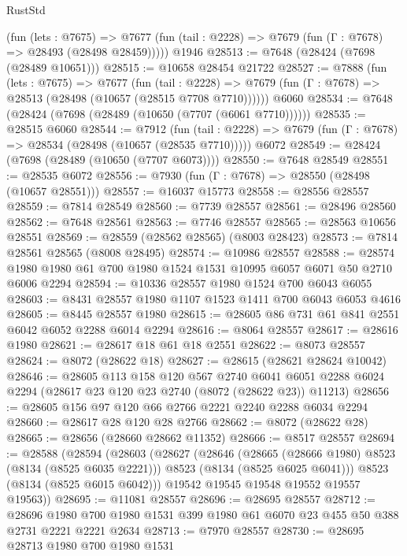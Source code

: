 \begin{lexlean}{RustStd}
\begin{coremodule}
{\begin{coremodule}
{{{{{{{{{{{{{{{{{{{{{{{{{{{{{{{{{{{{{{{{{{{{{{{{{{{{{      (fun (lets : @7675) =>
      @7677 (fun (tail : @2228) => @7679 (fun (Γ : @7678) => @28493 (@28498 @28459)))))
    @1946
@28513 := @7648 (@28424 (@7698 (@28489 @10651)))
@28515 := @10658 @28454 @21722
@28527 := @7888
    (fun (lets : @7675) =>
    @7677
      (fun (tail : @2228) =>
      @7679 (fun (Γ : @7678) => @28513 (@28498 (@10657 (@28515 @7708 @7710))))))
    @6060
@28534 := @7648 (@28424 (@7698 (@28489 (@10650 (@7707 (@6061 @7710))))))
@28535 := @28515 @6060
@28544 := @7912
    (fun (tail : @2228) => @7679 (fun (Γ : @7678) => @28534 (@28498 (@10657 (@28535 @7710)))))
    @6072
@28549 := @28424 (@7698 (@28489 (@10650 (@7707 @6073))))
@28550 := @7648 @28549
@28551 := @28535 @6072
@28556 := @7930 (fun (Γ : @7678) => @28550 (@28498 (@10657 @28551)))
@28557 := @16037 @15773
@28558 := @28556 @28557
@28559 := @7814 @28549
@28560 := @7739 @28557
@28561 := @28496 @28560
@28562 := @7648 @28561
@28563 := @7746 @28557
@28565 := @28563 @10656 @28551
@28569 := @28559 (@28562 @28565) (@8003 @28423)
@28573 := @7814 @28561 @28565 (@8008 @28495)
@28574 := @10986 @28557
@28588 := @28574 @1980 @1980 @61 @700 @1980 @1524 @1531 @10995 @6057 @6071 @50 @2710 @6006 @2294
@28594 := @10336 @28557 @1980 @1524 @700 @6043 @6055
@28603 := @8431 @28557 @1980 @1107 @1523 @1411 @700 @6043 @6053 @4616
@28605 := @8445 @28557 @1980
@28615 := @28605 @86 @731 @61 @841 @2551 @6042 @6052 @2288 @6014 @2294
@28616 := @8064 @28557
@28617 := @28616 @1980
@28621 := @28617 @18 @61 @18 @2551
@28622 := @8073 @28557
@28624 := @8072 (@28622 @18)
@28627 := @28615 (@28621 @28624 @10042)
@28646 := @28605
    @113
    @158
    @120
    @567
    @2740
    @6041
    @6051
    @2288
    @6024
    @2294
    (@28617 @23 @120 @23 @2740 (@8072 (@28622 @23)) @11213)
@28656 := @28605 @156 @97 @120 @66 @2766 @2221 @2240 @2288 @6034 @2294
@28660 := @28617 @28 @120 @28 @2766
@28662 := @8072 (@28622 @28)
@28665 := @28656 (@28660 @28662 @11352)
@28666 := @8517 @28557
@28694 := @28588
    (@28594
      (@28603
        (@28627
          (@28646
            (@28665 (@28666 @1980) @8523 (@8134 (@8525 @6035 @2221)))
            @8523
            (@8134 (@8525 @6025 @6041)))
          @8523
          (@8134 (@8525 @6015 @6042)))
        @19542
        @19545
        @19548
        @19552
        @19557
        @19563))
@28695 := @11081 @28557
@28696 := @28695 @28557
@28712 := @28696
    @1980
    @700
    @1980
    @1531
    @399
    @1980
    @61
    @6070
    @23
    @455
    @50
    @388
    @2731
    @2221
    @2221
    @2634
@28713 := @7970 @28557
@28730 := @28695
    @28713
    @1980
    @700
    @1980
    @1531
}}}}}}}}}}}}}}}}}}}}}}}}}}}}}}}}}}}}}}}}}}}}}}}}}}}}}
\end{coremodule}}
\end{coremodule}
\end{lexlean}
